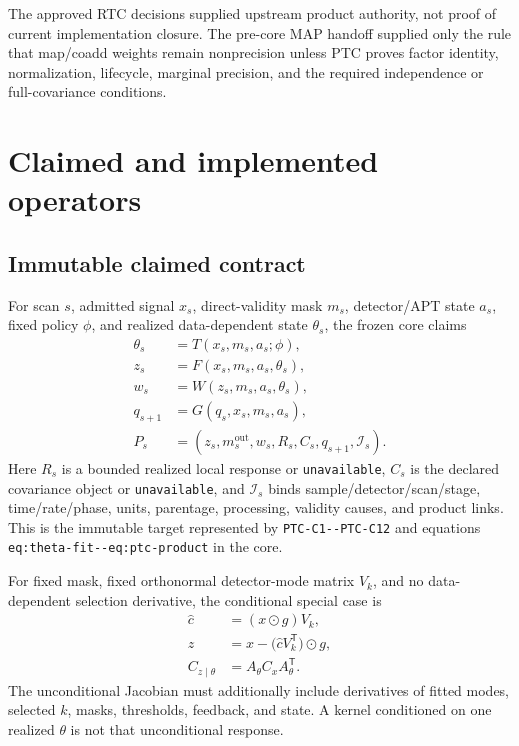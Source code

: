 \documentclass[11pt]{article}
\newcommand{\code}[1]{\nolinkurl{#1}}
\newcommand{\unknown}{\texttt{unavailable}}
\begin{document}
The approved RTC decisions supplied upstream product authority, not proof of
current implementation closure.  The pre-core MAP handoff supplied only the
rule that map/coadd weights remain nonprecision unless PTC proves factor
identity, normalization, lifecycle, marginal precision, and the required
independence or full-covariance conditions.

\section{Claimed and implemented operators}

\subsection{Immutable claimed contract}

For scan \(s\), admitted signal \(x_s\), direct-validity mask \(m_s\),
detector/APT state \(a_s\), fixed policy \(\phi\), and realized
data-dependent state \(\theta_s\), the frozen core claims
\begin{align}
  \theta_s &= T(x_s,m_s,a_s;\phi),\\
  z_s &= F(x_s,m_s,a_s,\theta_s),\\
  w_s &= W(z_s,m_s,a_s,\theta_s),\\
  q_{s+1} &= G(q_s,x_s,m_s,a_s),\\
  P_s &= (z_s,m_s^{\mathrm{out}},w_s,R_s,C_s,q_{s+1},
          \mathcal I_s).
\end{align}
Here \(R_s\) is a bounded realized local response or \unknown{}, \(C_s\) is
the declared covariance object or \unknown{}, and \(\mathcal I_s\) binds
sample/detector/scan/stage, time/rate/phase, units, parentage, processing,
validity causes, and product links.  This is the immutable target represented
by \code{PTC-C1--PTC-C12} and equations
\code{eq:theta-fit--eq:ptc-product} in the core.

For fixed mask, fixed orthonormal detector-mode matrix \(V_k\), and no
data-dependent selection derivative, the conditional special case is
\begin{align}
  \widehat c &= (x\odot g)V_k,\\
  z &= x-\bigl(\widehat cV_k^{\mathsf T}\bigr)\odot g,\\
  C_{z\mid\theta} &= A_\theta C_x A_\theta^{\mathsf T}.
\end{align}
The unconditional Jacobian must additionally include derivatives of fitted
modes, selected \(k\), masks, thresholds, feedback, and state.  A kernel
conditioned on one realized \(\theta\) is not that unconditional response.
\end{document}
